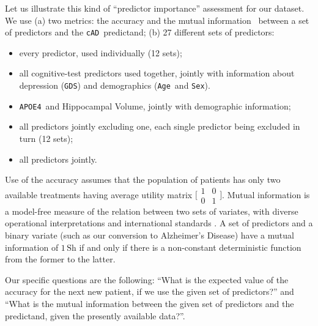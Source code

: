 \documentclass[utf8]{FrontiersinHarvard} %
\newcommand*{\wrench}{{\fontencoding{U}\fontfamily{fontawesomethree}\selectfont\symbol{114}}}
\newcommand{\mynotew}[1]{{\color{notecolour}\wrench\ #1}}
\renewcommand*{\|}[1][]{\nonscript\:#1\vert\nonscript\:\mathopen{}}
\newcommand*{\age}{\texttt{Age}}
\newcommand*{\sex}{\texttt{Sex}}
\newcommand*{\apoe}{\texttt{APOE4}}
\newcommand*{\gds}{\texttt{GDS}}
\newcommand*{\cad}{\texttt{cAD}}
\newcommand*{\ad}{Alzheimer's Disease}
\begin{document}
Let us illustrate this kind of \enquote{predictor importance} assessment for our dataset. We use (a) two metrics: the accuracy and the mutual information~\citep{shannon1948,coveretal1991_r2006} between a set of predictors and the \cad\ predictand; (b) 27 different sets of predictors:
\begin{itemize}
\item every predictor, used individually (12 sets);
\item all cognitive-test predictors used together, jointly with information about depression (\gds) and demographics (\age\ and \sex).
\item \apoe\ and Hippocampal Volume, jointly with demographic information;
\item all predictors jointly excluding one, each single predictor being excluded in turn (12 sets);
\item all predictors jointly.
\end{itemize}

Use of the accuracy assumes that the population of patients has only two available treatments having average utility matrix $\bigl[\begin{smallmatrix} 1&0\\0&1 \end{smallmatrix}\bigr]$. Mutual information is a model-free measure of the relation between two sets of variates, with diverse operational interpretations \citep{mackay1995_r2005,woodward1953_r1964,minka1998d_r2003,good1961c,goodetal1968,kelly1956,kullback1959_r1978} and international standards \citep{iso2008c}. A set of predictors and a binary variate (such as our conversion to \ad) have a mutual information of $1\,\mathrm{Sh}$ if and only if there is a non-constant deterministic function from the former to the latter.

Our specific questions are the following: \enquote{What is the expected value of the accuracy for the next new patient, if we use the given set of predictors?} and \enquote{What is the mutual information between the given set of predictors and the predictand, given the presently available data?}.
\end{document}
